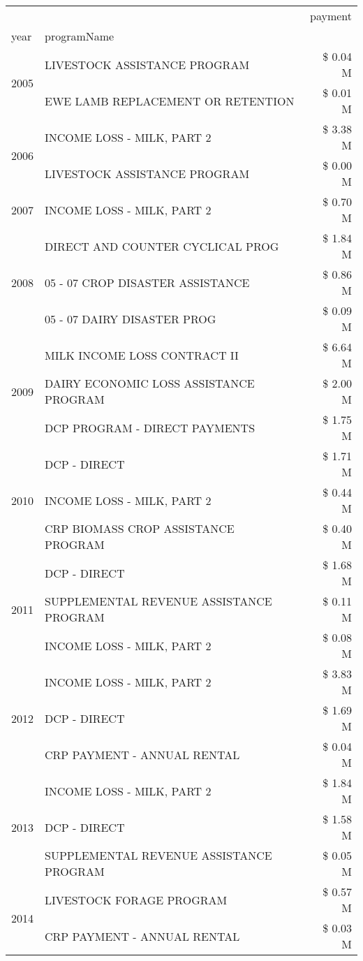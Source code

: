 \begin{tabular}{llr}
\toprule
 &  & payment \\
year & programName &  \\
\midrule
\multirow[t]{2}{*}{2005} & LIVESTOCK ASSISTANCE PROGRAM & \$ 0.04 M \\
 & EWE LAMB REPLACEMENT OR RETENTION & \$ 0.01 M \\
\cline{1-3}
\multirow[t]{2}{*}{2006} & INCOME LOSS - MILK, PART 2 & \$ 3.38 M \\
 & LIVESTOCK ASSISTANCE PROGRAM & \$ 0.00 M \\
\cline{1-3}
2007 & INCOME LOSS - MILK, PART 2 & \$ 0.70 M \\
\cline{1-3}
\multirow[t]{3}{*}{2008} & DIRECT AND COUNTER CYCLICAL PROG & \$ 1.84 M \\
 & 05 - 07 CROP DISASTER ASSISTANCE & \$ 0.86 M \\
 & 05 - 07 DAIRY DISASTER PROG & \$ 0.09 M \\
\cline{1-3}
\multirow[t]{3}{*}{2009} & MILK INCOME LOSS CONTRACT II & \$ 6.64 M \\
 & DAIRY ECONOMIC LOSS ASSISTANCE PROGRAM & \$ 2.00 M \\
 & DCP PROGRAM - DIRECT PAYMENTS & \$ 1.75 M \\
\cline{1-3}
\multirow[t]{3}{*}{2010} & DCP - DIRECT & \$ 1.71 M \\
 & INCOME LOSS - MILK, PART 2 & \$ 0.44 M \\
 & CRP BIOMASS CROP ASSISTANCE PROGRAM & \$ 0.40 M \\
\cline{1-3}
\multirow[t]{3}{*}{2011} & DCP - DIRECT & \$ 1.68 M \\
 & SUPPLEMENTAL REVENUE ASSISTANCE PROGRAM & \$ 0.11 M \\
 & INCOME LOSS - MILK, PART 2 & \$ 0.08 M \\
\cline{1-3}
\multirow[t]{3}{*}{2012} & INCOME LOSS - MILK, PART 2 & \$ 3.83 M \\
 & DCP - DIRECT & \$ 1.69 M \\
 & CRP PAYMENT - ANNUAL RENTAL & \$ 0.04 M \\
\cline{1-3}
\multirow[t]{3}{*}{2013} & INCOME LOSS - MILK, PART 2 & \$ 1.84 M \\
 & DCP - DIRECT & \$ 1.58 M \\
 & SUPPLEMENTAL REVENUE ASSISTANCE PROGRAM & \$ 0.05 M \\
\cline{1-3}
\multirow[t]{3}{*}{2014} & LIVESTOCK FORAGE PROGRAM & \$ 0.57 M \\
 & CRP PAYMENT - ANNUAL RENTAL & \$ 0.03 M \\

\end{tabular}

